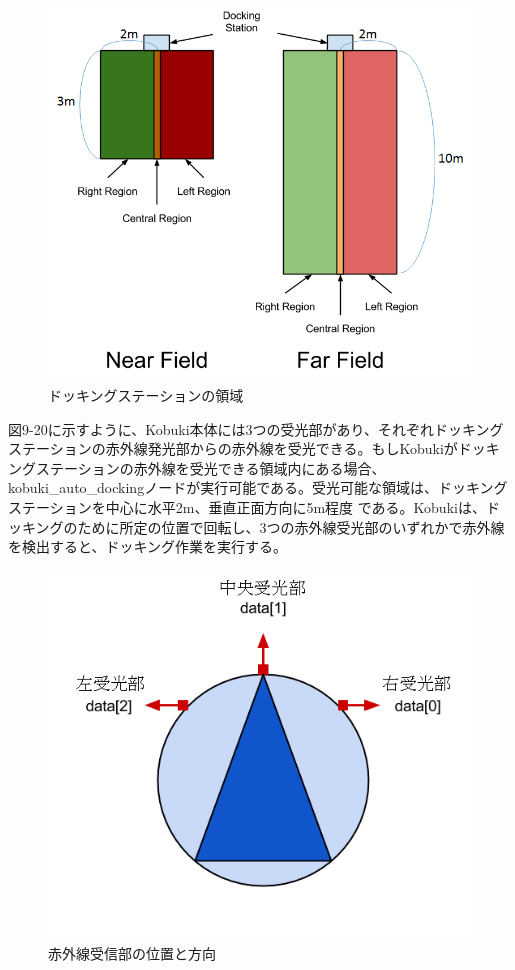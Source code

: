 \begin{itemize}
\begin{figure}[ht]
  \centering
  \includegraphics[width=\columnwidth]{pictures/chapter9/pic_09_19.png}
  \caption{ドッキングステーションの領域}
\end{figure}

図9-20に示すように、Kobuki本体には3つの受光部があり、それぞれドッキングステーションの赤外線発光部からの赤外線を受光できる。もしKobukiがドッキングステーションの赤外線を受光できる領域内にある場合、kobuki\_auto\_dockingノードが実行可能である。受光可能な領域は、ドッキングステーションを中心に水平2m、垂直正面方向に5m程度   である。Kobukiは、ドッキングのために所定の位置で回転し、3つの赤外線受光部のいずれかで赤外線を検出すると、ドッキング作業を実行する。

\begin{figure}[ht]
  \centering
  \includegraphics[width=\columnwidth]{pictures/chapter9/pic_09_20.png}
  \caption{赤外線受信部の位置と方向}
\end{figure}


\end{itemize}
